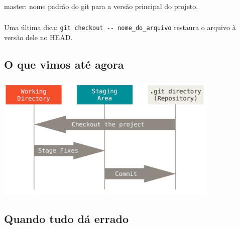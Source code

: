 \documentclass[aspectratio=169]{beamer}
\makeatletter
\newcommand*{\currentname}{\@currentlabelname}
\makeatother
\begin{document}
\begin{frame}
  \frametitle{\currentname}
  \begin{center}
    {\Huge master: nome padrão do git para a versão principal do projeto. 
    }
  \end{center}
\end{frame}

\begin{frame}
  \frametitle{\currentname}
  \begin{center}
    Uma última dica: \texttt{git checkout -{}- nome\_do\_arquivo} restaura o arquivo à versão dele no HEAD.
  \end{center}
\end{frame}

\subsection{O que vimos até agora}
\begin{frame}
  \frametitle{\currentname}
  \begin{center}
    \includegraphics[width=0.8\textwidth]{img/areas.png}
  \end{center}
\end{frame}

\subsection{Quando tudo dá errado}
\begin{frame}
  \frametitle{\currentname}
  \begin{itemize}
  \end{itemize}
\end{frame}
\end{document}
